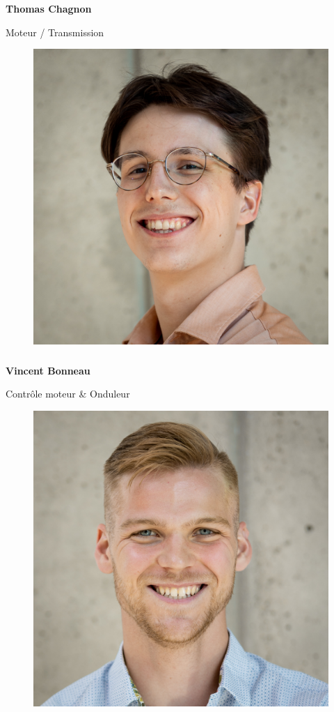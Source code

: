 \documentclass[a0paper,portrait]{baposter}
\begin{document}
\begin{poster}
{\subsubsection*{}
\vspace{2mm}
\textbf{Thomas Chagnon}

Moteur / Transmission

\begin{figure}
\includegraphics[width=.9\linewidth]{img/membres/Vincent-Bonneau-3.jpg} 
\end{figure}
\subsubsection*{}
\vspace{2mm}
\textbf{Vincent Bonneau}

Contrôle moteur \& Onduleur


\begin{figure}
\includegraphics[width=.9\linewidth]{img/membres/Xavier-Morin-2.jpg} 
\end{figure}
}
\end{poster}
\end{document}
